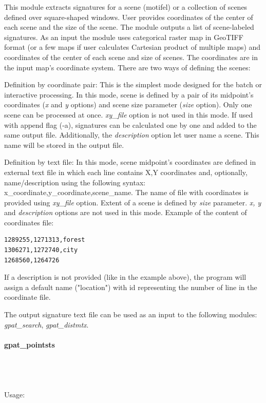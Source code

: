 \documentclass[12pt,margin=0.5in]{article}
\newcommand{\newparagraph}[1]{\paragraph{#1}\mbox{}\\}
\begin{document}
This module extracts signatures for a scene (motifel) or a collection of scenes defined over square-shaped windows. User provides coordinates of the center of each scene and the size of the scene. The module outputs a list of scene-labeled signatures.
As an input the module uses categorical raster map in GeoTIFF format (or a few maps if user calculates Cartesian product of multiple maps) and coordinates of the center of each scene and size of scenes. The coordinates are in the input map's coordinate system. There are two ways of defining the scenes:

Definition by coordinate pair: 
This is the simplest mode designed for the batch or interactive processing. In this mode, scene is defined by a pair of its midpoint's coordinates ({\it x} and {\it y} options) and scene size parameter ({\it size} option). Only one scene can be processed at once. {\it xy\_file} option is not used in this mode.
If used with append flag (-a), signatures can be calculated one by one and added to the same output file. Additionally, the {\it description} option let user name a scene. This name will be stored in the output file.

Definition by text file:
In this mode, scene midpoint's coordinates are defined in external text file in which each line contains X,Y coordinates and, optionally, name/description using the following syntax: x\_coordinate,y\_coordinate,scene\_name. The name of file with coordinates is provided using {\it xy\_file} option. Extent of a scene is defined by {\it size} parameter. {\it x, y} and {\it description} options are not used in this mode. Example of the content of coordinates file: 

\begin{minipage}{\linewidth}
\begin{lstlisting}
1289255,1271313,forest
1306271,1272740,city
1268560,1264726
\end{lstlisting}
\end{minipage}

If a description is not provided (like in the example above), the program will assign a default name ("location") with id representing the number of line in the coordinate file.

The output signature text file can be used as an input to the following modules: {\it gpat\_search}, {\it gpat\_distmtx}.

\newparagraph{gpat\_pointsts}
{}
\\\\
Usage:
\end{document}

